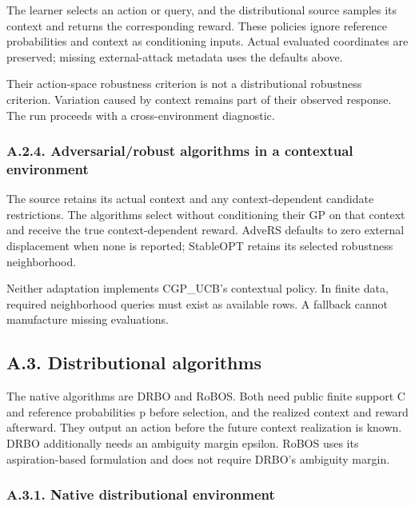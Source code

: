 \documentclass[10pt,a4paper]{article}
\begin{document}
The learner selects an action or query,\allowbreak{} and the distributional source samples its context and returns the corresponding reward. These policies ignore reference probabilities and context as conditioning inputs. Actual evaluated coordinates are preserved; missing external-attack metadata uses the defaults above.


Their action-space robustness criterion is not a distributional robustness criterion. Variation caused by context remains part of their observed response. The run proceeds with a cross-environment diagnostic.


\subsubsection*{A.2.4. Adversarial/robust algorithms in a contextual environment}

The source retains its actual context and any context-dependent candidate restrictions. The algorithms select without conditioning their GP on that context and receive the true context-dependent reward. AdveRS defaults to zero external displacement when none is reported; StableOPT retains its selected robustness neighborhood.


Neither adaptation implements CGP\_\allowbreak{}UCB's contextual policy. In finite data,\allowbreak{} required neighborhood queries must exist as available rows. A fallback cannot manufacture missing evaluations.


\subsection*{A.3. Distributional algorithms}

The native algorithms are DRBO and RoBOS. Both need public finite support C and reference probabilities p before selection,\allowbreak{} and the realized context and reward afterward. They output an action before the future context realization is known. DRBO additionally needs an ambiguity margin epsilon. RoBOS uses its aspiration-based formulation and does not require DRBO's ambiguity margin.


\subsubsection*{A.3.1. Native distributional environment}
\end{document}
